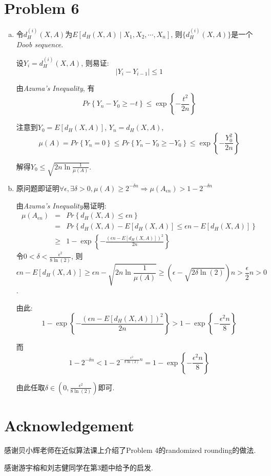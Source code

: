\documentclass[paper=a4, fontsize=11pt]{scrartcl} %
\numberwithin{equation}{section} %
\numberwithin{figure}{section} %
\numberwithin{table}{section} %
\begin{document}
\section*{Problem 6}
\begin{enumerate}[(a)]
\item
令$d_H^{(i)}(X, A)$为$E[d_H(X, A)\mid X_1, X_2, \cdots, X_n]$, 则$\{d_H^{(i)}(X,A)\}$是一个\textit{Doob sequence}.

设$Y_i = d_H^{(i)}(X, A)$, 则易证:
$$|Y_i - Y_{i-1}| \leq 1$$

由\textit{Azuma's Inequality}, 有
$$Pr\left\{Y_n - Y_0\geq -t\right\}\leq \exp\left\{-\frac{t^2}{2n}\right\} $$

注意到$Y_0 = E[d_H(X,A)]$, $Y_n = d_H(X,A)$, 
$$\mu(A) = Pr\left\{Y_n = 0\right\} \leq Pr\left\{Y_n - Y_0\geq -Y_0\right\} \leq \exp\left\{-\frac{Y_0^2}{2n}\right\}$$

解得$Y_0\leq \sqrt{2n\ln{\frac{1}{\mu(A)}}}$.
\item
原问题即证明$\forall \epsilon, \exists \delta > 0, \mu(A)\geq2^{-\delta n} \Longrightarrow \mu(A_{\epsilon n}) > 1 - 2^{-\delta n} $

由\textit{Azuma's Inequality}易证明:
\begin{eqnarray*}
\mu(A_{\epsilon n}) &=& Pr\left\{d_H(X,A) \leq \epsilon n\right\}\\ & = &Pr\left\{d_H(X, A) - E[d_H(X,A)] \leq \epsilon n - E[d_H(X,A)]\right\}\\ & \geq & 1 - \exp\left\{-\frac{\left(\epsilon n - E[d_H(X,A)]\right)^2}{2n}\right\}
\end{eqnarray*}
令$0 < \delta < \frac{\epsilon^2}{8\ln(2)}$, 则$$\epsilon n - E[d_H(X,A)] \geq \epsilon n - \sqrt{2n\ln\frac{1}{\mu(A)}} \geq \left(\epsilon - \sqrt{2\delta \ln(2)}\right)n > \frac{\epsilon}{2}n > 0$$.

由此:
$$1 - \exp\left\{-\frac{\left(\epsilon n - E[d_H(X,A)]\right)^2}{2n}\right\} > 1 - \exp\left\{-\frac{\epsilon^2 n}{8} \right\}$$

而$$1 - 2^{-\delta n} < 1 - 2^{-\frac{\epsilon^2}{8 \ln (2)}n} = 1 - \exp\left\{-\frac{\epsilon^2 n}{8}\right\} $$

由此任取$\delta \in \left(0, \frac{\epsilon^2}{8\ln(2)}\right)$即可.
\end{enumerate}

\section*{Acknowledgement}
感谢贝小辉老师在近似算法课上介绍了Problem 4的randomized rounding的做法.

感谢游宇榕和刘志健同学在第3题中给予的启发.
\end{document}
